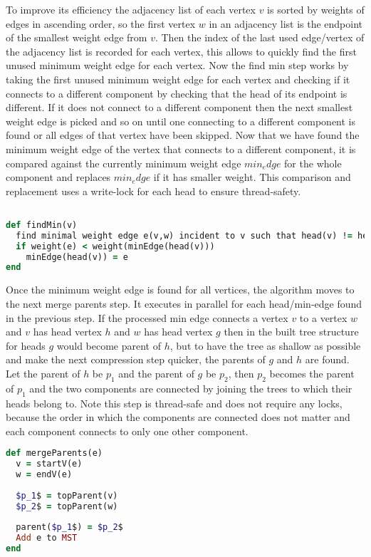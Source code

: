 \documentclass{report}
\theoremstyle{plain}
\theoremstyle{definition}
\theoremstyle{remark}
\begin{document}
To improve its efficiency the adjacency list of each vertex $v$ is sorted by weights of edges in ascending order, so the first vertex $w$ in an adjacency list is the endpoint of the smallest weight edge from $v$. Then the index of the last used edge/vertex of the adjacency list is recorded for each vertex, this allows to quickly find the first unused minimum weight edge for each vertex. Now the find min step works by taking the first unused minimum weight edge for each vertex and checking if it connects to a different component by checking that the head of its endpoint is different. If it does not connect to a different component then the next smallest weight edge is picked and so on until one connecting to a different component is found or all edges of that vertex have been skipped. Now that we have found the minimum weight edge of the vertex that connects to a different component, it is compared against the currently minimum weight edge $min_edge$ for the whole component and replaces $min_edge$ if it has smaller weight. This comparison and replacement uses a write-lock for each head to ensure thread-safety. 

\begin{lstlisting}[language=Ruby]

def findMin(v)
  find minimal weight edge e(v,w) incident to v such that head(v) != head(w)
  if weight(e) < weight(minEdge(head(v)))
    minEdge(head(v)) = e
end
\end{lstlisting}

Once the minimum weight edge is found for all vertices, the algorithm moves to the next merge parents step. It executes in parallel for each head/min-edge found in the previous step. If the processed min edge connects a vertex $v$ to a vertex $w$ and $v$ has head vertex $h$ and $w$ has head vertex $g$ then in the built tree structure for heads $g$ would become parent of $h$, but to have the tree as shallow as possible and make the next compression step quicker, the parents of $g$ and $h$ are found. Let the parent of $h$ be $p_1$ and the parent of $g$ be $p_2$, then $p_2$ becomes the parent of $p_1$ and the two components are connected by joining the trees to which their heads belong to. Note this step is thread-safe and does not require any locks, because the order in which the components are connected does not matter and each component connects to only one other component.

\begin{lstlisting}[language=Ruby, mathescape]
def mergeParents(e)
  v = startV(e)
  w = endV(e)
  
  $p_1$ = topParent(v)
  $p_2$ = topParent(w)
   
  parent($p_1$) = $p_2$
  Add e to MST 
end
\end{lstlisting}
\end{document}
